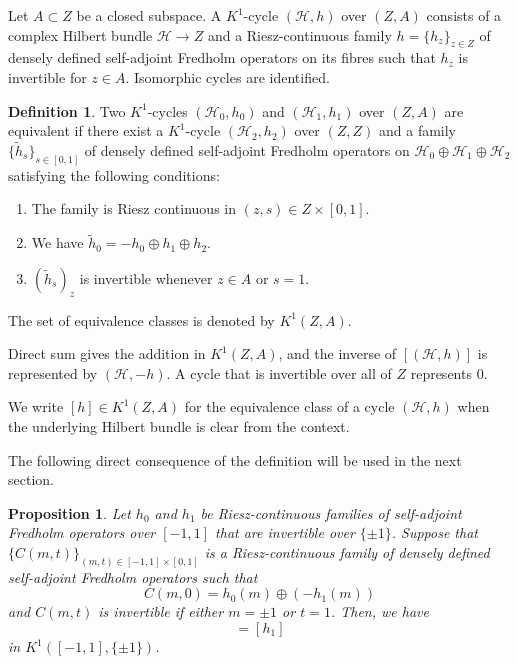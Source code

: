 \documentclass[a4paper,oneside,12pt]{amsart}
\theoremstyle{plain}
\newtheorem{proposition}[theorem]{Proposition}
\theoremstyle{definition}
\newtheorem{definition}[theorem]{Definition}
\theoremstyle{remark}
\begin{document}
Let $A \subset Z$ be a closed subspace.
A $K^1$-cycle $(\mathcal{H},h)$ over $(Z,A)$ consists of a complex Hilbert bundle $\mathcal{H} \to Z$ and a Riesz-continuous family $h = \{h_z\}_{z \in Z}$ of densely defined self-adjoint Fredholm operators on its fibres such that $h_z$ is invertible for $z \in A$.
Isomorphic cycles are identified.

\begin{definition}\label{definition: equivalence of K1 cycles}
  Two $K^1$-cycles $(\mathcal{H}_0,h_0)$ and $(\mathcal{H}_1,h_1)$ over $(Z,A)$ are equivalent if there exist a $K^1$-cycle $(\mathcal{H}_2,h_2)$ over $(Z,Z)$ and a family
  $\{\widetilde{h}_s\}_{s \in [0,1]}$ of densely defined self-adjoint Fredholm operators on $\mathcal{H}_0 \oplus \mathcal{H}_1 \oplus \mathcal{H}_2$ satisfying the following conditions:
  \begin{enumerate}
    \item The family is Riesz continuous in $(z,s)\in Z \times [0,1]$.
    \item We have $\widetilde{h}_0 = -h_0 \oplus h_1 \oplus h_2$.
    \item $(\widetilde{h}_s)_z$ is invertible whenever $z \in A$ or $s=1$.
  \end{enumerate}
  The set of equivalence classes is denoted by $K^1(Z,A)$.
\end{definition}

Direct sum gives the addition in $K^1(Z,A)$, and the inverse of $[(\mathcal{H},h)]$ is represented by $(\mathcal{H},-h)$.
A cycle that is invertible over all of $Z$ represents $0$.

We write $[h] \in K^1(Z,A)$ for the equivalence class of a cycle $(\mathcal{H},h)$ when the underlying Hilbert bundle is clear from the context.

The following direct consequence of the definition will be used in the next section.

\begin{proposition}\label{proposition: element equality criterion}
  Let $h_0$ and $h_1$ be Riesz-continuous families of self-adjoint Fredholm operators over $[-1,1]$ that are invertible over $\{\pm 1\}$.
  Suppose that $\{C(m,t)\}_{(m,t) \in [-1,1] \times [0,1]}$ is a Riesz-continuous family of densely defined self-adjoint Fredholm operators such that
  \begin{equation}
    C(m,0) = h_0(m) \oplus (-h_1(m))
  \end{equation}
  and $C(m,t)$ is invertible if either $m = \pm 1$ or $t = 1$.
  Then, we have
  \begin{equation}
    [h_0] = [h_1]
  \end{equation}
  in $K^1([-1,1],\{\pm 1\})$.
\end{proposition}
\end{document}
